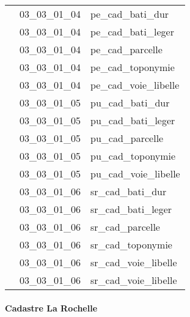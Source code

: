 \documentclass[12pt,titlepage]{book}
\begin{document}
\begin{supertabular}{|p{10cm}|c|p{15cm}|}
                    & 03\_03\_01\_04 & pe\_cad\_bati\_dur\\


                    & 03\_03\_01\_04 & pe\_cad\_bati\_leger\\


                    & 03\_03\_01\_04 & pe\_cad\_parcelle\\


                    & 03\_03\_01\_04 & pe\_cad\_toponymie\\


                    & 03\_03\_01\_04 & pe\_cad\_voie\_libelle\\


                    & 03\_03\_01\_05 & pu\_cad\_bati\_dur\\


                    & 03\_03\_01\_05 & pu\_cad\_bati\_leger\\


                    & 03\_03\_01\_05 & pu\_cad\_parcelle\\


                    & 03\_03\_01\_05 & pu\_cad\_toponymie\\


                    & 03\_03\_01\_05 & pu\_cad\_voie\_libelle\\


                    & 03\_03\_01\_06 & sr\_cad\_bati\_dur\\


                    & 03\_03\_01\_06 & sr\_cad\_bati\_leger\\


                    & 03\_03\_01\_06 & sr\_cad\_parcelle\\


                    & 03\_03\_01\_06 & sr\_cad\_toponymie\\


                    & 03\_03\_01\_06 & sr\_cad\_voie\_libelle\\


                    & 03\_03\_01\_06 & sr\_cad\_voie\_libelle\\
\hline
\end{supertabular}


\paragraph{Cadastre La Rochelle}
\noindent
\vspace{\baselineskip}
\end{document}
